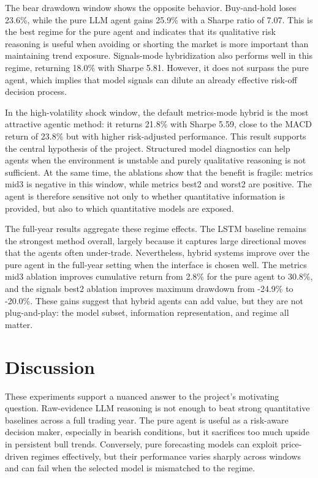 The bear drawdown window shows the opposite behavior.  Buy-and-hold loses 23.6\%, while the pure LLM agent gains 25.9\% with a Sharpe ratio of 7.07.  This is the best regime for the pure agent and indicates that its qualitative risk reasoning is useful when avoiding or shorting the market is more important than maintaining trend exposure.  Signals-mode hybridization also performs well in this regime, returning 18.0\% with Sharpe 5.81.  However, it does not surpass the pure agent, which implies that model signals can dilute an already effective risk-off decision process.

In the high-volatility shock window, the default metrics-mode hybrid is the most attractive agentic method: it returns 21.8\% with Sharpe 5.59, close to the MACD return of 23.8\% but with higher risk-adjusted performance.  This result supports the central hypothesis of the project.  Structured model diagnostics can help agents when the environment is unstable and purely qualitative reasoning is not sufficient.  At the same time, the ablations show that the benefit is fragile: metrics mid3 is negative in this window, while metrics best2 and worst2 are positive.  The agent is therefore sensitive not only to whether quantitative information is provided, but also to which quantitative models are exposed.

The full-year results aggregate these regime effects.  The LSTM baseline remains the strongest method overall, largely because it captures large directional moves that the agents often under-trade.  Nevertheless, hybrid systems improve over the pure agent in the full-year setting when the interface is chosen well.  The metrics mid3 ablation improves cumulative return from 2.8\% for the pure agent to 30.8\%, and the signals best2 ablation improves maximum drawdown from -24.9\% to -20.0\%.  These gains suggest that hybrid agents can add value, but they are not plug-and-play: the model subset, information representation, and regime all matter.

\section{Discussion}

These experiments support a nuanced answer to the project's motivating question.  Raw-evidence LLM reasoning is not enough to beat strong quantitative baselines across a full trading year.  The pure agent is useful as a risk-aware decision maker, especially in bearish conditions, but it sacrifices too much upside in persistent bull trends.  Conversely, pure forecasting models can exploit price-driven regimes effectively, but their performance varies sharply across windows and can fail when the selected model is mismatched to the regime.

